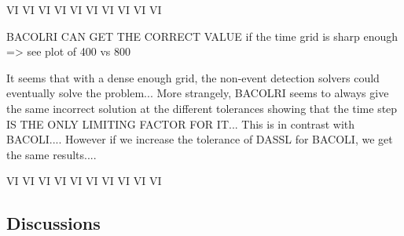 \documentclass{article}
\begin{document}
VI VI VI VI VI VI VI VI VI VI

BACOLRI CAN GET THE CORRECT VALUE if the time grid is sharp enough => see plot of 400 vs 800

It seems that with a dense enough grid, the non-event detection solvers could eventually solve the problem...
More strangely, BACOLRI seems to always give the same incorrect solution at the different tolerances showing that the time step IS THE ONLY LIMITING FACTOR FOR IT...
This is in contrast with BACOLI....
However if we increase the tolerance of DASSL for BACOLI, we get the same results.... 


VI VI VI VI VI VI VI VI VI VI

\subsection{Discussions}
\end{document}
